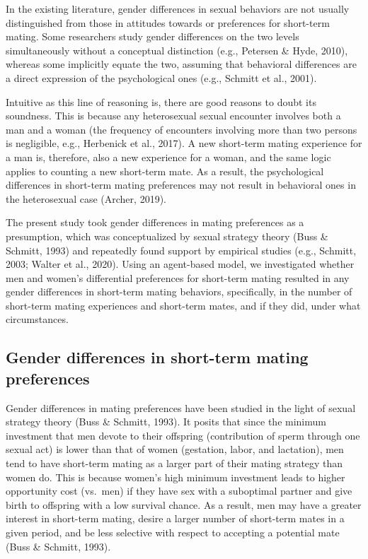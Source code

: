 \documentclass[
  11pt,
]{article}
\begin{document}
In the existing literature, gender differences in sexual behaviors are
not usually distinguished from those in attitudes towards or preferences
for short-term mating. Some researchers study gender differences on the
two levels simultaneously without a conceptual distinction (e.g.,
Petersen \& Hyde, 2010), whereas some implicitly equate the two,
assuming that behavioral differences are a direct expression of the
psychological ones (e.g., Schmitt et al., 2001).

Intuitive as this line of reasoning is, there are good reasons to doubt
its soundness. This is because any heterosexual sexual encounter
involves both a man and a woman (the frequency of encounters involving
more than two persons is negligible, e.g., Herbenick et al., 2017). A
new short-term mating experience for a man is, therefore, also a new
experience for a woman, and the same logic applies to counting a new
short-term mate. As a result, the psychological differences in
short-term mating preferences may not result in behavioral ones in the
heterosexual case (Archer, 2019).

The present study took gender differences in mating preferences as a
presumption, which was conceptualized by sexual strategy theory (Buss \&
Schmitt, 1993) and repeatedly found support by empirical studies (e.g.,
Schmitt, 2003; Walter et al., 2020). Using an agent-based model, we
investigated whether men and women's differential preferences for
short-term mating resulted in any gender differences in short-term
mating behaviors, specifically, in the number of short-term mating
experiences and short-term mates, and if they did, under what
circumstances.

\hypertarget{gender-differences-in-short-term-mating-preferences}{%
\subsection{Gender differences in short-term mating
preferences}\label{gender-differences-in-short-term-mating-preferences}}

Gender differences in mating preferences have been studied in the light
of sexual strategy theory (Buss \& Schmitt, 1993). It posits that since
the minimum investment that men devote to their offspring (contribution
of sperm through one sexual act) is lower than that of women (gestation,
labor, and lactation), men tend to have short-term mating as a larger
part of their mating strategy than women do. This is because women's
high minimum investment leads to higher opportunity cost (vs.~men) if
they have sex with a suboptimal partner and give birth to offspring with
a low survival chance. As a result, men may have a greater interest in
short-term mating, desire a larger number of short-term mates in a given
period, and be less selective with respect to accepting a potential mate
(Buss \& Schmitt, 1993).
\end{document}
